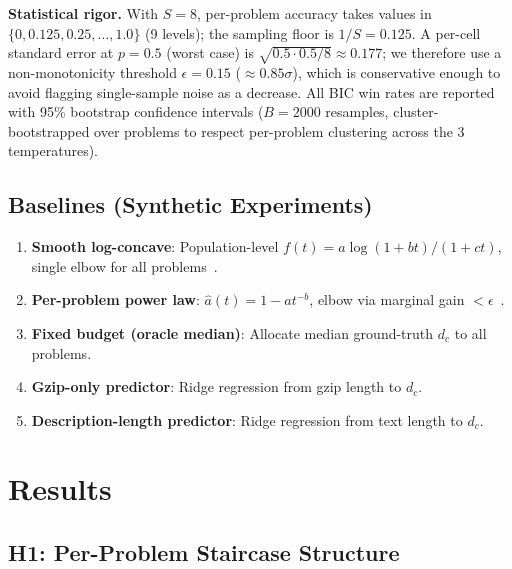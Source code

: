 \documentclass{article}
\begin{document}
\textbf{Statistical rigor.}  With $S{=}8$, per-problem accuracy takes values in $\{0, 0.125, 0.25, \ldots, 1.0\}$ (9 levels); the sampling floor is $1/S{=}0.125$.  A per-cell standard error at $p{=}0.5$ (worst case) is $\sqrt{0.5\cdot0.5/8}\approx 0.177$; we therefore use a non-monotonicity threshold $\epsilon{=}0.15$ ($\approx 0.85\sigma$), which is conservative enough to avoid flagging single-sample noise as a decrease.  All BIC win rates are reported with 95\% bootstrap confidence intervals ($B{=}2000$ resamples, cluster-bootstrapped over problems to respect per-problem clustering across the 3 temperatures).

\subsection{Baselines (Synthetic Experiments)}

\begin{enumerate}[leftmargin=*,itemsep=1pt]
    \item \textbf{Smooth log-concave}: Population-level $f(t) = a\log(1{+}bt)/(1{+}ct)$, single elbow for all problems~\citep{polyanskiy2024it}.
    \item \textbf{Per-problem power law}: $\hat{a}(t) = 1 - at^{-b}$, elbow via marginal gain $< \epsilon$~\citep{snell2024scaling}.
    \item \textbf{Fixed budget (oracle median)}: Allocate median ground-truth $d_c$ to all problems.
    \item \textbf{Gzip-only predictor}: Ridge regression from gzip length to $d_c$.
    \item \textbf{Description-length predictor}: Ridge regression from text length to $d_c$.
\end{enumerate}

\section{Results}
\label{sec:results}

\subsection{H1: Per-Problem Staircase Structure}
\label{sec:h1}
\end{document}
